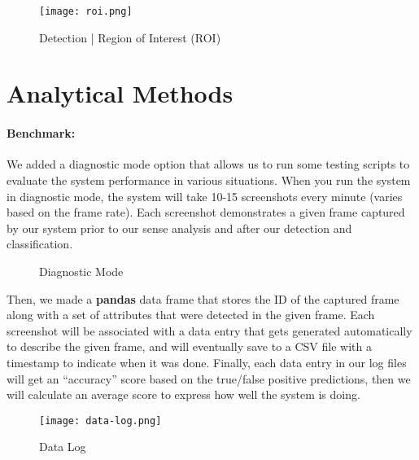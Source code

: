 \begin{figure}[h!]
	\centering
    \texttt{[image: roi.png]}
    \caption{Detection | Region of Interest (ROI)}
\end{figure}


\pagebreak

\section{Analytical Methods}

\paragraph{Benchmark:} We added a diagnostic mode option that allows us to run some testing scripts to evaluate the system performance in various situations. When you run the system in diagnostic mode, the system will take 10-15 screenshots every minute (varies based on the frame rate). Each screenshot demonstrates a given frame captured by our system prior to our sense analysis and after our detection and classification. 

\begin{figure}[h!]
  \centering
  \qquad
  \caption{Diagnostic Mode}
\end{figure}

Then, we made a \textbf{pandas} data frame that stores the ID of the captured frame along with a set of attributes that were detected in the given frame. Each screenshot will be associated with a data entry that gets generated automatically to describe the given frame, and will eventually save to a CSV file with a timestamp to indicate when it was done. Finally, each data entry in our log files will get an “accuracy” score based on the true/false positive predictions, then we will calculate an average score to express how well the system is doing.  

\begin{figure}[h!]
	\centering
    \texttt{[image: data-log.png]}
    \caption{Data Log}
\end{figure}

